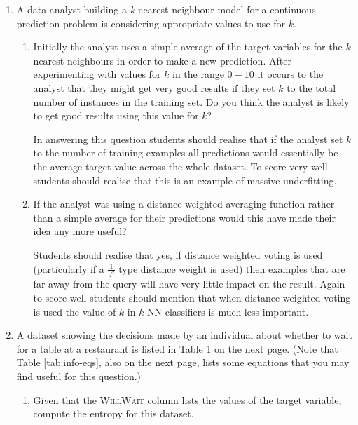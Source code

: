 \documentclass[solution]{ditpaper}
\begin{document}
\clearpage

\newpage

\question 
	\begin{enumerate}
		\item A data analyst building a \emph{k}-nearest neighbour model for a continuous prediction problem is considering appropriate values to use for $k$. 
	\begin{enumerate}
		\item Initially the analyst uses a simple average of the target variables for the $k$ nearest neighbours in order to make a new prediction. After experimenting with values for $k$ in the range $0 - 10$ it occurs to the analyst that they might get very good results if they set $k$ to the total number of instances in the training set. Do you think the analyst is likely to get good results using this value for $k$?
\begin{answer}
In answering this question students should realise that if the analyst set $k$ to the number of training examples all predictions would essentially be the average target value across the whole dataset. To score very well students should realise that this is an example of massive underfitting.
\end{answer}
		\item If the analyst was using a distance weighted averaging function rather than a simple average for their predictions would this have made their idea any more useful?
\begin{answer}
Students should realise that yes, if distance weighted voting is used (particularly if a $\frac{1}{d^2}$ type distance weight is used) then examples that are far away from the query will have very little impact on the result. Again to score well students should mention that when distance weighted voting is used the value of $k$ in $k$-NN classifiers is much less important.
\end{answer}
	\end{enumerate}
		\item A dataset showing the decisions made by an individual about whether to wait for a table at a restaurant is listed in Table 1 on the next page. (Note that Table \ref{tab:info-eqs}, also on the next page, lists some equations that you may find useful for this question.)		
	\begin{enumerate}
		\item Given that the \textsc{WillWait} column lists the values of the target variable, compute the entropy for this dataset.

\end{enumerate}
\end{enumerate}
\end{document}
